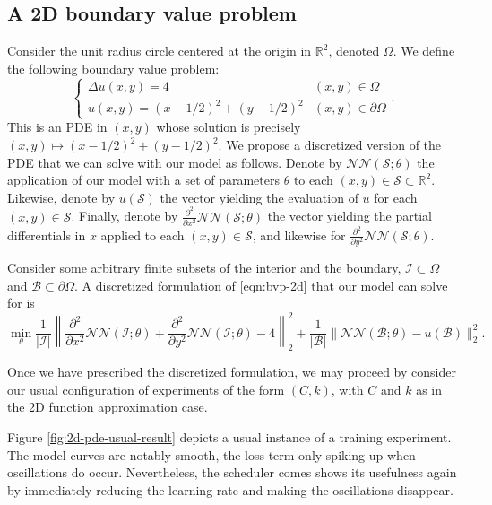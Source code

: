 \documentclass[12pt]{report} %
\begin{document}
\clearpage

\subsection*{A 2D boundary value problem}

Consider the unit radius circle centered at the origin in $\mathbb{R}^2$,
denoted $\Omega$. We define the following boundary value problem:
\begin{equation}
  \left\{\begin{array}{ll}
    \Delta u (x, y) = 4                      & (x, y) \in \Omega          \\
    u (x, y) = (x - 1 / 2)^2 + (y - 1 / 2)^2 & (x, y) \in \partial \Omega
  \end{array}\right. . \label{eqn:bvp-2d}
\end{equation}
This is an PDE in $(x, y)$ whose solution is precisely $(x, y) \mapsto (x - 1
  / 2)^2 + (y - 1 / 2)^2$. We propose a discretized version of the PDE that we
can solve with our model as follows. Denote by $\mathcal{N}\mathcal{N}
  (\mathcal{S}; \theta)$ the application of our model with a set of parameters
$\theta$ to each $(x, y) \in \mathcal{S} \subset \mathbb{R}^2$. Likewise,
denote by $u (\mathcal{S})$ the vector yielding the evaluation of $u$ for each
$(x, y) \in \mathcal{S}$. Finally, denote by $\frac{\partial^2}{\partial x^2}
  \mathcal{N}\mathcal{N} (\mathcal{S}; \theta)$ the vector yielding the partial
differentials in $x$ applied to each $(x, y) \in \mathcal{S}$, and likewise
for $\frac{\partial^2}{\partial y^2} \mathcal{N}\mathcal{N} (\mathcal{S};
  \theta)$.

Consider some arbitrary finite subsets of the interior and the boundary,
$\mathcal{I} \subset \Omega$ and $\mathcal{B} \subset \partial \Omega$. A
discretized formulation of \eqref{eqn:bvp-2d} that our model can solve for is
\[ \min_{\theta} \frac{1}{| \mathcal{I} |} \left\| \frac{\partial^2}{\partial
    x^2} \mathcal{N}\mathcal{N} (\mathcal{I}; \theta) +
  \frac{\partial^2}{\partial y^2} \mathcal{N}\mathcal{N} (\mathcal{I};
  \theta) - 4 \right\|_2^2 + \frac{1}{| \mathcal{B} |} \|
  \mathcal{N}\mathcal{N} (\mathcal{B}; \theta) - u (\mathcal{B}) \|_2^2 . \]

Once we have prescribed the discretized formulation, we may proceed by consider our usual configuration of experiments of the form $(C,k)$, with $C$ and $k$ as in the 2D function approximation case.

Figure \ref{fig:2d-pde-usual-result} depicts a usual instance of a training experiment. The model curves are notably smooth, the loss term only spiking up when oscillations do occur. Nevertheless, the scheduler comes shows its usefulness again by immediately reducing the learning rate and making the oscillations disappear.
\end{document}
